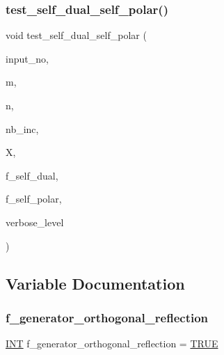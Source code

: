 \subsubsection{\texorpdfstring{test\+\_\+self\+\_\+dual\+\_\+self\+\_\+polar()}{test\_self\_dual\_self\_polar()}}
{\footnotesize\ttfamily void test\+\_\+self\+\_\+dual\+\_\+self\+\_\+polar (\begin{DoxyParamCaption}\item[{\mbox{\hyperlink{galois_8h_a09fddde158a3a20bd2dcadb609de11dc}{I\+NT}}}]{input\+\_\+no,  }\item[{\mbox{\hyperlink{galois_8h_a09fddde158a3a20bd2dcadb609de11dc}{I\+NT}}}]{m,  }\item[{\mbox{\hyperlink{galois_8h_a09fddde158a3a20bd2dcadb609de11dc}{I\+NT}}}]{n,  }\item[{\mbox{\hyperlink{galois_8h_a09fddde158a3a20bd2dcadb609de11dc}{I\+NT}}}]{nb\+\_\+inc,  }\item[{\mbox{\hyperlink{galois_8h_a09fddde158a3a20bd2dcadb609de11dc}{I\+NT}} $\ast$}]{X,  }\item[{\mbox{\hyperlink{galois_8h_a09fddde158a3a20bd2dcadb609de11dc}{I\+NT}} \&}]{f\+\_\+self\+\_\+dual,  }\item[{\mbox{\hyperlink{galois_8h_a09fddde158a3a20bd2dcadb609de11dc}{I\+NT}} \&}]{f\+\_\+self\+\_\+polar,  }\item[{\mbox{\hyperlink{galois_8h_a09fddde158a3a20bd2dcadb609de11dc}{I\+NT}}}]{verbose\+\_\+level }\end{DoxyParamCaption})}



\subsection{Variable Documentation}
\mbox{\label{action__global_8_c_af62154fb706a07f3006fbaea4211eba2}} 
\subsubsection{\texorpdfstring{f\+\_\+generator\+\_\+orthogonal\+\_\+reflection}{f\_generator\_orthogonal\_reflection}}
{\footnotesize\ttfamily \mbox{\hyperlink{galois_8h_a09fddde158a3a20bd2dcadb609de11dc}{I\+NT}} f\+\_\+generator\+\_\+orthogonal\+\_\+reflection = \mbox{\hyperlink{nauty_8h_aa8cecfc5c5c054d2875c03e77b7be15d}{T\+R\+UE}}}

